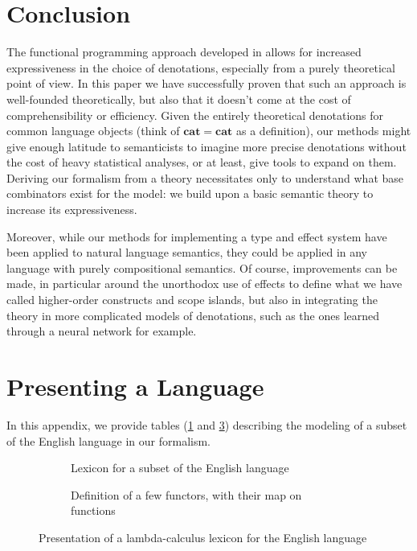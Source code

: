 \documentclass[a4paper,UKenglish,cleveref, autoref, thm-restate]{lipics-v2021}
\begin{document}
\section{Conclusion}
The functional programming approach developed in
\cite{bumfordEffectdrivenInterpretationFunctors2025} allows for increased
expressiveness in the choice of denotations, especially from a purely
theoretical point of view.
In this paper we have successfully proven that such an approach is well-founded
theoretically, but also that it doesn't come at the cost of comprehensibility
or efficiency.
Given the entirely theoretical denotations for common language objects (think
of $\mathbf{cat} = \mathbf{cat}$ as a definition), our methods might give
enough latitude to semanticists to imagine more precise denotations without the
cost of heavy statistical analyses, or at least, give tools to expand on them.
Deriving our formalism from a theory necessitates only to understand what base
combinators exist for the model: we build upon a basic semantic theory to
increase its expressiveness.

Moreover, while our methods for implementing a type and effect system have been
applied to natural language semantics, they could be applied in any language
with purely compositional semantics.
Of course, improvements can be made, in particular around the unorthodox use of
effects to define what we have called higher-order constructs and scope
islands, but also in integrating the theory in more complicated models of
denotations, such as the ones learned through a neural network for example.

\appendix


\section{Presenting a Language}
In this appendix, we provide tables (\ref{fig:lexicon} and \ref{fig:functors}) describing the
modeling of a subset of the English language in our formalism.

\begin{figure}[h!]
	\centering
	\begin{subfigure}{.9\textwidth}
		\centering
		
		\caption{Lexicon for a subset of the English language}
		\label{fig:lexicon}
	\end{subfigure}

	\medskip

	\begin{subfigure}{\textwidth}
		\centering
		\resizebox{\textwidth}{!}{%
			
		}
		\caption{Definition of a few functors, with their map on functions}
		\label{fig:functors}
	\end{subfigure}
	\caption{Presentation of a lambda-calculus lexicon for the English language}
\end{figure}
\end{document}
